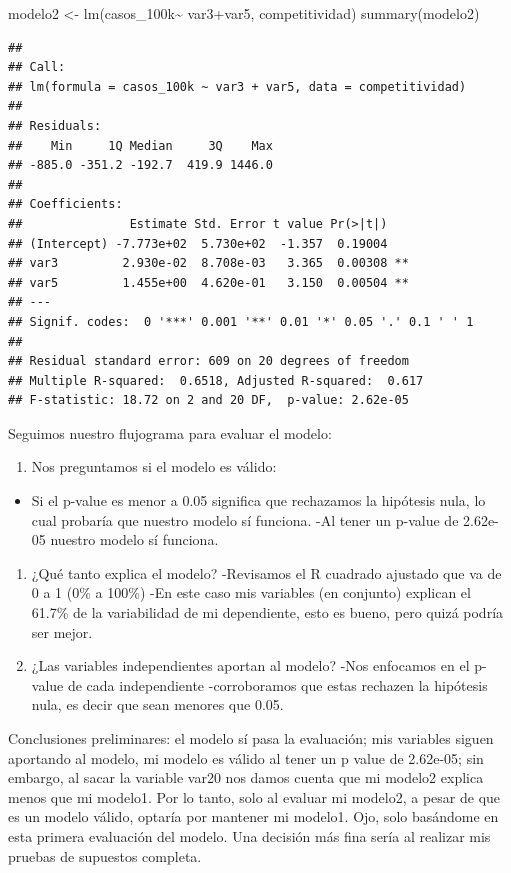 \documentclass[
]{article}
\newenvironment{Shaded}{\begin{snugshade}}{\end{snugshade}}
\newcommand{\FunctionTok}[1]{\textcolor[rgb]{0.00,0.00,0.00}{#1}}
\newcommand{\NormalTok}[1]{#1}
\newcommand{\OtherTok}[1]{\textcolor[rgb]{0.56,0.35,0.01}{#1}}
\newcommand{\SpecialCharTok}[1]{\textcolor[rgb]{0.00,0.00,0.00}{#1}}
\providecommand{\tightlist}{%
  \setlength{\itemsep}{0pt}\setlength{\parskip}{0pt}}
\begin{document}
\begin{Shaded}
\begin{Highlighting}[]
\NormalTok{modelo2 }\OtherTok{\textless{}{-}} \FunctionTok{lm}\NormalTok{(casos\_100k}\SpecialCharTok{\textasciitilde{}}\NormalTok{ var3}\SpecialCharTok{+}\NormalTok{var5, competitividad)}
\FunctionTok{summary}\NormalTok{(modelo2)}
\end{Highlighting}
\end{Shaded}

\begin{verbatim}
## 
## Call:
## lm(formula = casos_100k ~ var3 + var5, data = competitividad)
## 
## Residuals:
##    Min     1Q Median     3Q    Max 
## -885.0 -351.2 -192.7  419.9 1446.0 
## 
## Coefficients:
##               Estimate Std. Error t value Pr(>|t|)   
## (Intercept) -7.773e+02  5.730e+02  -1.357  0.19004   
## var3         2.930e-02  8.708e-03   3.365  0.00308 **
## var5         1.455e+00  4.620e-01   3.150  0.00504 **
## ---
## Signif. codes:  0 '***' 0.001 '**' 0.01 '*' 0.05 '.' 0.1 ' ' 1
## 
## Residual standard error: 609 on 20 degrees of freedom
## Multiple R-squared:  0.6518, Adjusted R-squared:  0.617 
## F-statistic: 18.72 on 2 and 20 DF,  p-value: 2.62e-05
\end{verbatim}

Seguimos nuestro flujograma para evaluar el modelo:

\begin{enumerate}
\def\labelenumi{\arabic{enumi}.}
\tightlist
\item
  Nos preguntamos si el modelo es válido:
\end{enumerate}

\begin{itemize}
\tightlist
\item
  Si el p-value es menor a 0.05 significa que rechazamos la hipótesis
  nula, lo cual probaría que nuestro modelo sí funciona. -Al tener un
  p-value de 2.62e-05 nuestro modelo sí funciona.
\end{itemize}

\begin{enumerate}
\def\labelenumi{\arabic{enumi}.}
\setcounter{enumi}{1}
\tightlist
\item
  ¿Qué tanto explica el modelo? -Revisamos el R cuadrado ajustado que va
  de 0 a 1 (0\% a 100\%) -En este caso mis variables (en conjunto)
  explican el 61.7\% de la variabilidad de mi dependiente, esto es
  bueno, pero quizá podría ser mejor.
\item
  ¿Las variables independientes aportan al modelo? -Nos enfocamos en el
  p-value de cada independiente -corroboramos que estas rechazen la
  hipótesis nula, es decir que sean menores que 0.05.
\end{enumerate}

Conclusiones preliminares: el modelo sí pasa la evaluación; mis
variables siguen aportando al modelo, mi modelo es válido al tener un p
value de 2.62e-05; sin embargo, al sacar la variable var20 nos damos
cuenta que mi modelo2 explica menos que mi modelo1. Por lo tanto, solo
al evaluar mi modelo2, a pesar de que es un modelo válido, optaría por
mantener mi modelo1. Ojo, solo basándome en esta primera evaluación del
modelo. Una decisión más fina sería al realizar mis pruebas de supuestos
completa.
\end{document}
